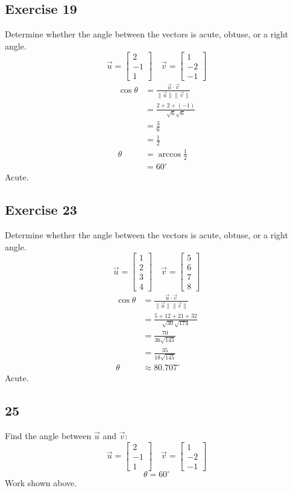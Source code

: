 \documentclass[letterpaper, 12pt]{math}
\begin{document}
\subsection*{Exercise 19}
Determine whether the angle between the vectors is acute, obtuse, or a right
angle.
\[ \vec{u} = \begin{bmatrix}2 \\ -1 \\ 1\end{bmatrix} \quad
  \vec{v} = \begin{bmatrix}1 \\ -2 \\ -1\end{bmatrix} \]
\begin{align*}
  \cos\theta &= \frac{\vec{u}\cdot\vec{v}}{\|\vec{u}\|\|\vec{v}\|} \\
  &= \frac{2+2+(-1)}{\sqrt{6}\sqrt{6}} \\
  &= \frac{3}{6} \\
  &= \frac{1}{2} \\
  \theta &= \arccos\frac{1}{2} \\
  &= 60^{\circ}
\end{align*}
Acute.

\subsection*{Exercise 23}
Determine whether the angle between the vectors is acute, obtuse, or a right
angle.
\[ \vec{u} = \begin{bmatrix}1 \\ 2 \\ 3 \\ 4\end{bmatrix} \quad
  \vec{v} = \begin{bmatrix}5 \\ 6 \\ 7 \\ 8\end{bmatrix} \]
\begin{align*}
  \cos\theta &= \frac{\vec{u}\cdot\vec{v}}{\|\vec{u}\|\|\vec{v}\|} \\
  &= \frac{5+12+21+32}{\sqrt{30}\sqrt{174}} \\
  &= \frac{70}{36\sqrt{145}} \\
  &= \frac{35}{18\sqrt{145}} \\
  \theta &\approx 80.707^{\circ}
\end{align*}
Acute.

\subsection*{25}
Find the angle between \( \vec{u} \) and \( \vec{v} \):
\[ \vec{u} = \begin{bmatrix}2 \\ -1 \\ 1\end{bmatrix} \quad
  \vec{v} = \begin{bmatrix}1 \\ -2 \\ -1\end{bmatrix} \]
\[ \theta = 60^{\circ} \]
Work shown above.
\end{document}
